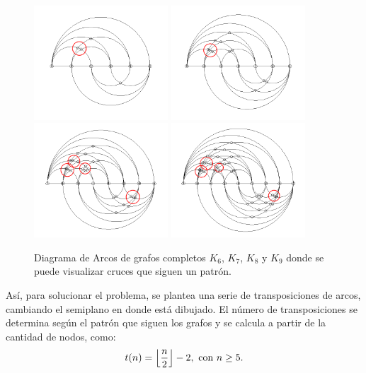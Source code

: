 	\begin{figure}[h]
		\centering
		\includegraphics[width=5cm]{imagenes/grafo_1_bn_no_opt.png}
		\includegraphics[width=5cm]{imagenes/grafo_2_bn_no_opt.png}\\
		\includegraphics[width=5cm]{imagenes/grafo_3_bn_no_opt.png}
		\includegraphics[width=5cm]{imagenes/grafo_4_bn_no_opt.png}
		\caption{Diagrama de Arcos de grafos completos $K_6$, $K_7$, $K_8$ y $K_9$ donde se puede visualizar cruces que siguen un patrón.}
		\label{fig:arcdiagram_no_optimo}
	\end{figure}
	
	
	Así, para solucionar el problema, se plantea una serie de transposiciones de arcos, cambiando el semiplano en donde está dibujado. El  número de transposiciones se determina según el patrón que siguen los grafos y  se calcula a partir de la cantidad de nodos, como:	$$t(n) = \floor*{\frac{n}{2}}-2,\ \mbox{con } n\geq 5.$$
	
